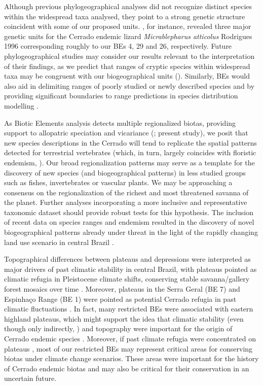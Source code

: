 \documentclass[12pt,openright,oneside,a4paper,english]{abntex2}
\begin{document}
Although previous phylogeographical analyses \citep{Santos2014, LimaRezende2019, Vasconcellos2019} did not recognize distinct species within the widespread taxa analysed, they point to a strong genetic structure coincident with some of our proposed units. \citet{Santos2014}, for instance, revealed three major genetic units for the Cerrado endemic lizard \textit{Micrablepharus atticolus} Rodrigues 1996 corresponding roughly  to our BEs 4, 29 and 26, respectively. Future phylogeographical studies may consider our results relevant to the interpretation of their findings, as we predict that ranges of cryptic species within widespread taxa may be congruent with our biogeographical units (\citealp[see][]{Vasconcellos2019}). Similarly, BEs would also aid in delimiting ranges of poorly studied or newly described species and by providing significant boundaries to range predictions in species distribution modelling \citep{Franklin2010, Raxworthy2003}.

As Biotic Elements analysis detects multiple regionalized biotas, providing support to allopatric speciation and vicariance (\citealp[][]{Hausdorf2003, Nogueira2011, Azevedo2016}; present study), we posit that new species descriptions in the Cerrado will tend to replicate the spatial patterns detected for terrestrial vertebrates (which, in turn, largely coincides with floristic endemism, \citealp[see][]{Simon2000}). Our broad regionalization patterns may serve as a template for the discovery of new species (and biogeographical patterns) in less studied groups such as fishes, invertebrates or vascular plants. We may be approaching a consensus on the regionalization of the richest and most threatened savanna of the planet. Further analyses incorporating a more inclusive and representative taxonomic dataset should provide robust tests for this hypothesis. The inclusion of recent data on species ranges and endemism resulted in the discovery of novel biogeographical patterns already under threat in the light of the rapidly changing land use scenario in central Brazil \citep{Strassburg2017, Liuetal2022}.

Topographical differences between plateaus and depressions were interpreted as major drivers of past climatic stability in central Brazil, with plateaus pointed as climatic refugia in Pleistocene climate shifts, conserving stable savanna/gallery forest mosaics over time \citep{BrownGiff2002, Vasconcellos2019}. Moreover, plateaus in the Serra Geral (BE 7) and Espinhaço Range (BE 1) were pointed as potential Cerrado refugia in past climatic fluctuations \citep{Werneck2012}. In fact, many restricted BEs were associated with eastern highland plateaus, which might support the idea that climatic stability (even though only indirectly, \citealp[see][]{Marin2018}) and topography were important for the origin of Cerrado endemic species \citep{Silva1997, LimaRezende2019, Vasconcellos2019}. Moreover, if past climate refugia were concentrated on plateaus \citep{Werneck2012}, most of our restricted BEs may represent critical areas for conserving biotas under climate change scenarios. These areas were important for the history of Cerrado endemic biotas and may also be critical for their conservation in an uncertain future.
\end{document}

